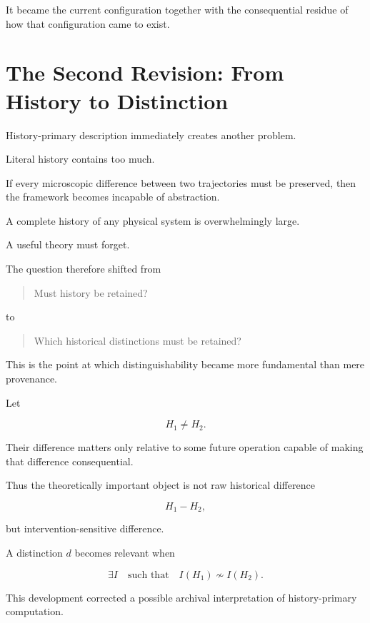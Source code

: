 \documentclass[11pt]{article}
\theoremstyle{remark}
\begin{document}
It became the current configuration together with the consequential residue of how that configuration came to exist.

\section{The Second Revision: From History to Distinction}

History-primary description immediately creates another problem.

Literal history contains too much.

If every microscopic difference between two trajectories must be preserved, then the framework becomes incapable of abstraction.

A complete history of any physical system is overwhelmingly large.

A useful theory must forget.

The question therefore shifted from

\begin{quote}
Must history be retained?
\end{quote}

to

\begin{quote}
Which historical distinctions must be retained?
\end{quote}

This is the point at which distinguishability became more fundamental than mere provenance.

Let

\begin{equation}
H_1\neq H_2.
\end{equation}

Their difference matters only relative to some future operation capable of making that difference consequential.

Thus the theoretically important object is not raw historical difference

\begin{equation}
H_1-H_2,
\end{equation}

but intervention-sensitive difference.

A distinction $d$ becomes relevant when

\begin{equation}
\exists I
\quad
\text{such that}
\quad
I(H_1)\not\sim I(H_2).
\end{equation}

This development corrected a possible archival interpretation of history-primary computation.
\end{document}
